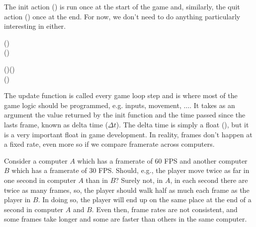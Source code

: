 The init action () is run once at the start of the game and, similarly,
the quit action () once at the end. For now, we don't need to do anything
particularly interesting in either.

\begin{minipage}{0.47\textwidth}
\begin{hscode}\SaveRestoreHook
{}%
%
\>[B]{}\mathbin{::}\;(){}\<[E]%
\\
\>[B]{}\mathrel{=}\;(){}\<[E]%
\ColumnHook
\end{hscode}\resethooks
\end{minipage}
\begin{minipage}{0.47\textwidth}
\begin{hscode}\SaveRestoreHook
{}%
%
\>[B]{}\mathbin{::}()\to {}\;(){}\<[E]%
\\
\>[B]{}\;()\mathrel{=}\mathbin{\$}\;\<[E]%
\ColumnHook
\end{hscode}\resethooks
\end{minipage}

The update function is called every game loop step and is where most of the
game logic should be programmed, e.g. inputs, movement, $\dots$. It takes as an
argument the value returned by the init function and the time passed since the
lasts frame, known as delta time ($\Delta t$).
%
The delta time is simply a float (), but it is a very
important float in game development. In reality, frames don't happen at a fixed
rate, even more so if we compare framerate across computers.

Consider a computer $A$ which has a framerate of 60 FPS and another computer
$B$ which has a framerate of 30 FPS. Should, e.g., the player move twice as far
in one second in computer $A$ than in $B$? Surely not, in $A$, in each second
there are twice as many frames, so, the player should walk half as much each
frame as the player in $B$. In doing so, the player will end up on the same
place at the end of a second in computer $A$ and $B$. Even then, frame rates
are not consistent, and some frames take longer and some are faster than others
in the same computer.

